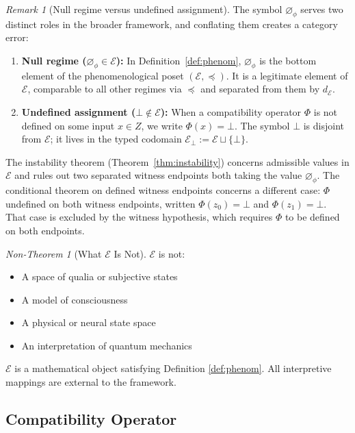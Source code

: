 \documentclass[11pt,a4paper]{article}
\theoremstyle{plain}
\theoremstyle{definition}
\theoremstyle{remark}
\newtheorem{remark}[theorem]{Remark}
\newtheorem{nontheorem}[theorem]{Non-Theorem}
\newcommand{\E}{\mathcal{E}}
\newcommand{\dE}{d_{\mathcal{E}}}
\newcommand{\nullphi}{\varnothing_\phi}
\begin{document}
\begin{remark}[Null regime versus undefined assignment]\label{rem:null-vs-undefined}
The symbol $\nullphi$ serves two distinct roles in the broader framework, and conflating them creates a category error:
\begin{enumerate}
\item \textbf{Null regime ($\nullphi\in\E$):} In Definition~\ref{def:phenom}, $\nullphi$ is the bottom element of the phenomenological poset $(\E,\preceq)$. It is a legitimate element of $\E$, comparable to all other regimes via $\preceq$ and separated from them by $\dE$.
\item \textbf{Undefined assignment ($\bot\notin\E$):} When a compatibility operator $\Phi$ is not defined on some input $x\in Z$, we write $\Phi(x)=\bot$. The symbol $\bot$ is disjoint from $\E$; it lives in the typed codomain $\E_\bot:=\E\sqcup\{\bot\}$.
\end{enumerate}
The instability theorem (Theorem~\ref{thm:instability}) concerns admissible values in $\E$ and rules out two separated witness endpoints both taking the value $\nullphi$. The conditional theorem on defined witness endpoints concerns a different case: $\Phi$ undefined on both witness endpoints, written $\Phi(z_0)=\bot$ and $\Phi(z_1)=\bot$. That case is excluded by the witness hypothesis, which requires $\Phi$ to be defined on both endpoints.
\end{remark}

\begin{nontheorem}[What $\E$ Is Not]
$\E$ is not:
\begin{itemize}
\item A space of qualia or subjective states
\item A model of consciousness
\item A physical or neural state space
\item An interpretation of quantum mechanics
\end{itemize}
$\E$ is a mathematical object satisfying Definition \ref{def:phenom}. All interpretive mappings are external to the framework.
\end{nontheorem}

\subsection{Compatibility Operator}
\end{document}
